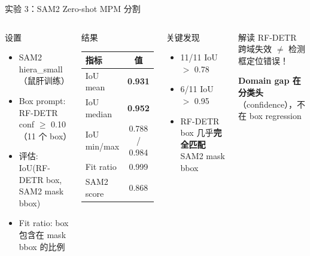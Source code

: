 \documentclass[aspectratio=169, 10pt]{beamer}
\begin{document}
\begin{frame}{实验 3：SAM2 Zero-shot MPM 分割}
  \begin{columns}[T]
    \begin{block}{设置}
      \begin{itemize}
        \item SAM2 hiera\_small（鼠肝训练）
        \item Box prompt: RF-DETR conf $\geq$ 0.10（11 个 box）
        \item 评估: IoU(RF-DETR box, SAM2 mask bbox)
        \item Fit ratio: box 包含在 mask bbox 的比例
      \end{itemize}
    \end{block}
    \begin{block}{结果}
      \scriptsize
      \begin{tabular}{lc}
        \toprule
        \textbf{指标} & \textbf{值} \\
        \midrule
        IoU mean & \textbf{0.931} \\
        IoU median & \textbf{0.952} \\
        IoU min/max & 0.788 / 0.984 \\
        Fit ratio & 0.999 \\
        SAM2 score & 0.868 \\
        \bottomrule
      \end{tabular}
    \end{block}
    \begin{alertblock}{关键发现}
      \begin{itemize}
        \item 11/11 IoU $>$ 0.78
        \item 6/11 IoU $>$ 0.95
        \item RF-DETR box 几乎\textbf{完全匹配} SAM2 mask bbox
      \end{itemize}
    \end{alertblock}
    \begin{block}{解读}
      RF-DETR 跨域失效 $\neq$ 检测框定位错误！
      
      \textbf{Domain gap 在分类头}（confidence），不在 box regression
    \end{block}
  \end{columns}
\end{frame}
\end{document}
